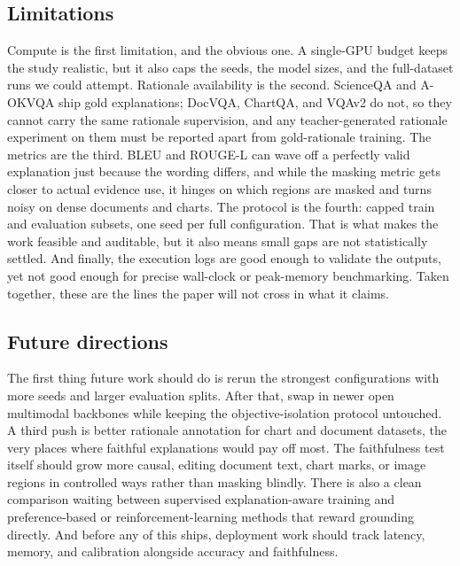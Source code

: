 \documentclass[preprint,12pt]{elsarticle}
\begin{document}
\subsection{Limitations}
Compute is the first limitation, and the obvious one.
A single-GPU budget keeps the study realistic, but it also caps the seeds, the model sizes, and the full-dataset runs we could attempt.
Rationale availability is the second.
ScienceQA and A-OKVQA ship gold explanations; DocVQA, ChartQA, and VQAv2 do not, so they cannot carry the same rationale supervision, and any teacher-generated rationale experiment on them must be reported apart from gold-rationale training.
The metrics are the third.
BLEU and ROUGE-L can wave off a perfectly valid explanation just because the wording differs, and while the masking metric gets closer to actual evidence use, it hinges on which regions are masked and turns noisy on dense documents and charts.
The protocol is the fourth: capped train and evaluation subsets, one seed per full configuration.
That is what makes the work feasible and auditable, but it also means small gaps are not statistically settled.
And finally, the execution logs are good enough to validate the outputs, yet not good enough for precise wall-clock or peak-memory benchmarking.
Taken together, these are the lines the paper will not cross in what it claims.

\subsection{Future directions}
The first thing future work should do is rerun the strongest configurations with more seeds and larger evaluation splits.
After that, swap in newer open multimodal backbones while keeping the objective-isolation protocol untouched.
A third push is better rationale annotation for chart and document datasets, the very places where faithful explanations would pay off most.
The faithfulness test itself should grow more causal, editing document text, chart marks, or image regions in controlled ways rather than masking blindly.
There is also a clean comparison waiting between supervised explanation-aware training and preference-based or reinforcement-learning methods that reward grounding directly.
And before any of this ships, deployment work should track latency, memory, and calibration alongside accuracy and faithfulness.
\end{document}
